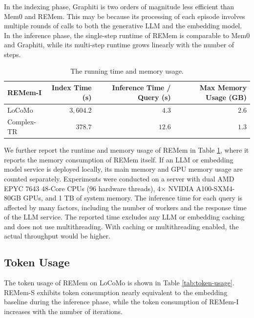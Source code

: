 \documentclass{article} %
\newcommand{\ours}{REMem\xspace}
\begin{document}
In the indexing phase, Graphiti is two orders of magnitude less efficient than Mem0 and \ours. This may be because its processing of each episode involves multiple rounds of calls to both the generative LLM and the embedding model.
In the inference phase, the single-step runtime of \ours is comparable to Mem0 and Graphiti, while its multi-step runtime grows linearly with the number of steps.

\begin{table}[]
\small
\centering
\caption{The running time and memory usage.}
\label{tab:time-space usage}
\begin{tabular}{lrrr}
\toprule
REMem-I & Index Time (s) & Inference Time / Query (s) & Max Memory Usage (GB) \\ \midrule
LoCoMo & $3,604.2$ & $4.3$ & $2.6$ \\
Complex-TR & $378.7$ & $12.6$ & $1.3$ \\
\bottomrule
\end{tabular}
\end{table}


We further report the runtime and memory usage of REMem in Table \ref{tab:time-space usage}, where it reports the memory consumption of REMem itself. If an LLM or embedding model service is deployed locally, its main memory and GPU memory usage are counted separately.
Experiments were conducted on a server with dual AMD EPYC 7643 48-Core CPUs (96 hardware threads), 4× NVIDIA A100-SXM4-80GB GPUs, and 1 TB of system memory.
The inference time for each query is affected by many factors, including the number of workers and the response time of the LLM service.
The reported time excludes any LLM or embedding caching and does not use multithreading. With caching or multithreading enabled, the actual throughput would be higher.

\subsection{Token Usage}

The token usage of \ours on LoCoMo is shown in Table \ref{tab:token-usage}.
\ours-S exhibits token consumption nearly equivalent to the embedding baseline during the inference phase, while the token consumption of \ours-I increases with the number of iterations.
\end{document}
